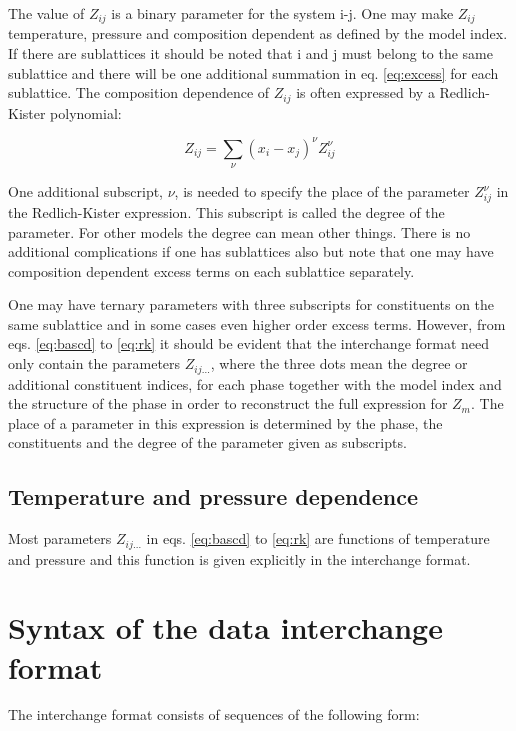 \documentclass[12pt]{article}
\begin{document}
The value of $Z_{ij}$ is a binary parameter for the system i-j. One
may make $Z_{ij}$ temperature, pressure and composition dependent as
defined by the model index. If there are sublattices it should be
noted that i and j must belong to the same sublattice and there will
be one additional summation in eq. \ref{eq:excess} for each
sublattice. The composition dependence of $Z_{ij}$ is often expressed
by a Redlich-Kister polynomial:

\begin{equation}
Z_{ij} = \sum_{\nu} (x_i - x_j)^{\nu} Z_{ij}^{\nu} \label{eq:rk}
\end{equation}

One additional subscript, $\nu$, is needed to specify the place of the
parameter $Z_{ij}^{\nu}$ in the Redlich-Kister expression. This
subscript is called the degree of the parameter. For other models the
degree can mean other things. There is no additional complications if
one has sublattices also but note that one may have composition
dependent excess terms on each sublattice separately.

One may have ternary parameters with three subscripts for constituents
on the same sublattice and in some cases even higher order excess
terms. However, from eqs. \ref{eq:bascd} to \ref{eq:rk} it should be
evident that the interchange format need only contain the parameters
$Z_{ij...}$, where the three dots mean the degree or additional
constituent indices, for each phase together with the model index and
the structure of the phase in order to reconstruct the full expression
for $Z_m$. The place of a parameter in this expression is determined
by the phase, the constituents and the degree of the parameter given
as subscripts.

\subsection{Temperature and pressure dependence}

Most parameters $Z_{ij...}$ in eqs. \ref{eq:bascd} to \ref{eq:rk} are
functions of temperature and pressure and this function is given
explicitly in the interchange format.

\section{Syntax of the data interchange format}

The interchange format consists of sequences of the following form:
\end{document}
